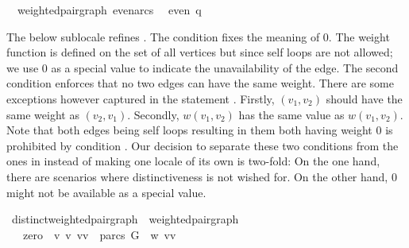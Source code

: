 \begin{isabellebody}
%
\endisadelimproof
%
\isatagproof
%
\endisatagproof
{\isafoldproof}%
%
\isadelimproof
\isanewline
%
\endisadelimproof
{}\isamarkupfalse%
\ {\isacharparenleft}\ weighted{\isacharunderscore}pair{\isacharunderscore}graph{\isacharparenright}\ even{\isacharunderscore}arcs{\isacharcolon}\ \isanewline
{}\ {\isachardoublequoteopen}even\ q{\isachardoublequoteclose}%
\isadelimproof
%
\endisadelimproof
%
\isatagproof
%
\endisatagproof
{\isafoldproof}%
%
\isadelimproof
%
\endisadelimproof
%
\begin{isamarkuptext}%
The below sublocale  refines
. The condition 
 fixes the meaning of 0.
The weight function is defined on the set of all vertices but since self loops are not allowed; 
we use 0 as a special value to indicate the unavailability of the edge. 
The second condition  enforces that no two edges can have the same weight. There
are some exceptions however captured in the statement .
Firstly, $(v_1,v_2)$ should have the same weight as $(v_2,v_1)$. Secondly, $w(v_1,v_2)$ has the
same value as $w(v_1,v_2)$. Note that both edges being self loops resulting in them both having 
weight 0 is prohibited by condition .
Our decision to separate these two conditions from the ones in 
instead of making one locale of its own is two-fold: On the one hand, there are scenarios where 
distinctiveness is not wished for. On the other hand, 0 might not be available as a special value.%
\end{isamarkuptext}\isamarkuptrue%
\isamarkupfalse%
\ distinct{\isacharunderscore}weighted{\isacharunderscore}pair{\isacharunderscore}graph\ {\isacharequal}\ weighted{\isacharunderscore}pair{\isacharunderscore}graph\ {\isacharplus}\ \isanewline
\ \ \ zero{\isacharcolon}\ {\isachardoublequoteopen}{\isasymforall}\ v\ v\ {\isacharparenleft}vv\ {\isasymnotin}\ parcs\ G\ {\isasymlongleftrightarrow}\ w\ {\isacharparenleft}vv\ {\isacharequal}\ {}{\isachardoublequoteclose}\isanewline

\end{isabellebody}
